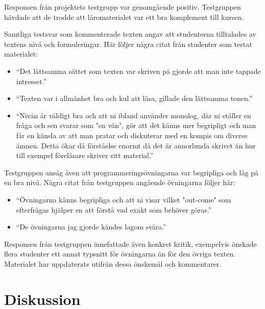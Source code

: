 \documentclass[]{article}
\begin{document}
Responsen från projektets testgrupp var genomgående positiv. Testgruppen hävdade att de trodde att läromaterialet var
ett bra komplement till kursen.

Samtliga testsvar som kommenterade texten angav att studenterna tilltalades av textens nivå och formuleringar. Här
följer några citat från studenter som testat materialet:
\begin{itemize}
  \item “Det lättsamma sättet som texten var skriven på gjorde att man inte tappade intresset.”
  \item “Texten var i allmänhet bra och kul att läsa, gillade den lättsamma tonen.”
  \item “Nivån är väldigt bra och att ni ibland använder monolog, där ni ställer en fråga och sen svarar som "en vän",
  gör att det känns mer begripligt och man får en känsla av att man pratar och diskuterar med en kompis om diverse ämnen.
  Detta ökar då förståelse enormt då det är annorlunda skrivet än hur till exempel föreläsare skriver sitt material.”
\end{itemize}

Testgruppen ansåg även att programmeringsövningarna var begripliga och låg på en bra nivå. Några citat från testgruppen
angående övningarna följer här:
\begin{itemize}
  \item “Övningarna känns begripliga och att ni visar vilket "out-come" som efterfrågas hjälper en att förstå vad
  exakt som behöver göras.”
  \item “De övningarna jag gjorde kändes lagom svåra.”
  \end{itemize}

Responsen från testgruppen innefattade även konkret kritik, exempelvis önskade flera studenter ett annat typsnitt för
övningarna än för den övriga texten. Materialet har uppdaterats utifrån dessa önskemål och kommentarer.

\section{Diskussion}

\end{document}
